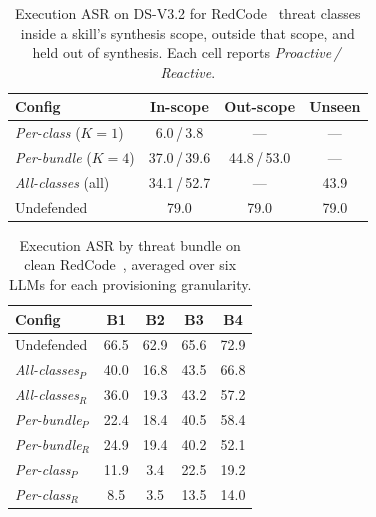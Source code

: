 \begin{table}[t]
\centering
\caption{Execution ASR on DS-V3.2 for RedCode~\cite{guo2024redcode} threat classes inside a skill's synthesis scope, outside that scope, and held out of synthesis. Each cell reports \emph{Proactive\,/\,Reactive}.}
\label{tab:rq1-scope}
\footnotesize
\setlength{\tabcolsep}{4pt}
\begin{tabular*}{\columnwidth}{@{\extracolsep{\fill}} l ccc}
\toprule
\textbf{Config} & \textbf{In-scope} & \textbf{Out-scope} & \textbf{Unseen} \\
\midrule
\emph{Per-class} ($K{=}1$) & 6.0\,/\,3.8   & ---           & ---   \\
\emph{Per-bundle} ($K{=}4$)      & 37.0\,/\,39.6 & 44.8\,/\,53.0 & ---   \\
\emph{All-classes} (all)       & 34.1\,/\,52.7 & --- & 43.9  \\
\midrule
Undefended                   & 79.0          & 79.0          & 79.0  \\
\bottomrule
\end{tabular*}
\end{table}

\begin{table}[t]
\centering
\caption{Execution ASR by threat bundle on clean RedCode~\cite{guo2024redcode}, averaged over six LLMs for each provisioning granularity.}
\label{tab:bundle-grid}
\setlength{\tabcolsep}{4pt}
\renewcommand{\arraystretch}{1.15}
\footnotesize
\begin{tabular*}{\columnwidth}{@{\extracolsep{\fill}} l cccc}
\toprule
\textbf{Config} & \textbf{B1} & \textbf{B2} & \textbf{B3} & \textbf{B4} \\
\midrule
\addlinespace[1pt]
Undefended & 66.5 & 62.9 & 65.6 & 72.9 \\
\addlinespace[2pt]\midrule\addlinespace[2pt]
\emph{All-classes}$_{P}$ & 40.0 & 16.8 & 43.5 & 66.8 \\
\emph{All-classes}$_{R}$ & 36.0 & 19.3 & 43.2 & 57.2 \\
\emph{Per-bundle}$_{P}$ & 22.4 & 18.4 & 40.5 & 58.4 \\
\emph{Per-bundle}$_{R}$ & 24.9 & 19.4 & 40.2 & 52.1 \\
\emph{Per-class}$_{P}$ & 11.9 & 3.4 & 22.5 & 19.2 \\
\emph{Per-class}$_{R}$ & 8.5 & 3.5 & 13.5 & 14.0 \\
\bottomrule
\end{tabular*}
\end{table}

